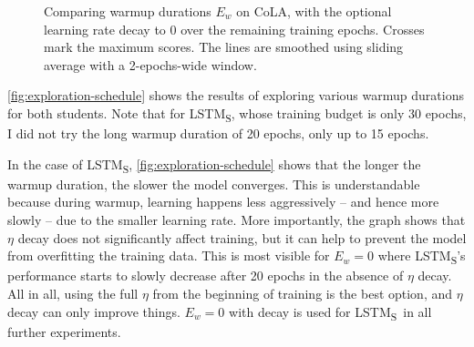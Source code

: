 \documentclass[bsc,frontabs,twoside,singlespacing,parskip,deptreport]{infthesis}
\def\LSTMS{LSTM\textsubscript{S}}
\def\sliding{The lines are smoothed using sliding average with a 2-epochs-wide window.}
\begin{document}
{{{      \begin{figure}[h!t]
        \centering
        \caption{Comparing warmup durations $E_w$ on CoLA, with the optional learning rate decay to 0 over the remaining training epochs. Crosses mark the maximum scores. \sliding}
        \label{fig:exploration-schedule}
      \end{figure}

      \autoref{fig:exploration-schedule} shows the results of exploring various warmup durations for both students. Note that for \LSTMS, whose training budget is only 30 epochs, I did not try the long warmup duration of 20 epochs, only up to 15 epochs.

      In the case of \LSTMS, \autoref{fig:exploration-schedule} shows that the longer the warmup duration, the slower the model converges. This is understandable because during warmup, learning happens less aggressively -- and hence more slowly -- due to the smaller learning rate. More importantly, the graph shows that $\eta$ decay does not significantly affect training, but it can help to prevent the model from overfitting the training data. This is most visible for $E_w=0$ where \LSTMS's performance starts to slowly decrease after 20 epochs in the absence of $\eta$ decay. All in all, using the full $\eta$ from the beginning of training is the best option, and $\eta$ decay can only improve things. $E_w=0$ with decay is used for \LSTMS~in all further experiments.

}}}
\end{document}
